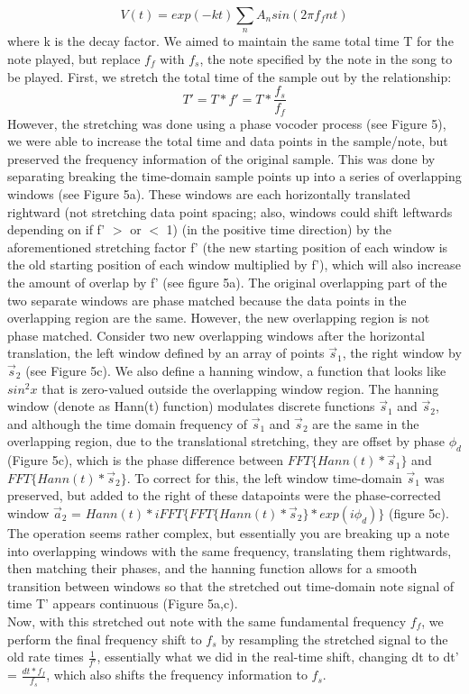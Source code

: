 \documentclass{article}
\begin{document}
\begin{enumerate}
            \begin{equation}
                V(t) = exp(-kt)\sum_n A_n sin(2\pi f_f nt)
            \end{equation}
            where k is the decay factor. We aimed to maintain the same total time T for the note played, but replace $f_f$ with $f_s$, the note specified by the note in the song to be played. First, we stretch the total time of the sample out by the relationship:
            \begin{equation}
                T' = T*f' = T*\frac{f_s}{f_f}
            \end{equation}
            However, the stretching was done using a phase vocoder process (see Figure 5), we were able to increase the total time and data points in the sample/note, but preserved the frequency information of the original sample. This was done by separating breaking the time-domain sample points up into a series of overlapping windows (see Figure 5a). These windows are each horizontally translated rightward (not stretching data point spacing; also, windows could shift leftwards depending on if f' $>$ or $<$ 1) (in the positive time direction) by the aforementioned stretching factor f' (the new starting position of each window is the old starting position of each window multiplied by f'), which will also increase the amount of overlap by f' (see figure 5a). The original overlapping part of the two separate windows are phase matched because the data points in the overlapping region are the same. However, the new overlapping region is not phase matched. Consider two new overlapping windows after the horizontal translation, the left window defined by an array of points $\vec{s}_1$, the right window by $\vec{s}_2$ (see Figure 5c). We also define a hanning window, a function that looks like $sin^2x$ that is zero-valued outside the overlapping window region. The hanning window (denote as Hann(t) function) modulates discrete functions $\vec{s}_1$ and $\vec{s}_2$, and although the time domain frequency of $\vec{s}_1$ and $\vec{s}_2$ are the same in the overlapping region, due to the translational stretching, they are offset by phase $\phi_d$ (Figure 5c), which is the phase difference between $FFT\{Hann(t)*\vec{s}_1\}$ and $FFT\{Hann(t)*\vec{s}_2\}$. To correct for this, the left window time-domain $\vec{s}_1$ was preserved, but added to the right of these datapoints were the phase-corrected window $\vec{a}_2$ = $Hann(t)*iFFT\{FFT\{Hann(t)*\vec{s}_2\}*exp(i\phi_d)\}$ (figure 5c). The operation seems rather complex, but essentially you are breaking up a note into overlapping windows with the same frequency, translating them rightwards, then matching their phases, and the hanning function allows for a smooth transition between windows so that the stretched out time-domain note signal of time T' appears continuous (Figure 5a,c). \\\indent Now, with this stretched out note with the same fundamental frequency $f_f$, we perform the final frequency shift  to $f_s$ by resampling the stretched signal to the old rate times $\frac{1}{f'}$, essentially what we did in the real-time shift, changing dt to dt' = $\frac{dt*f_f}{f_s}$, which also shifts the frequency information to $f_s$. 
\end{enumerate}
\end{document}
